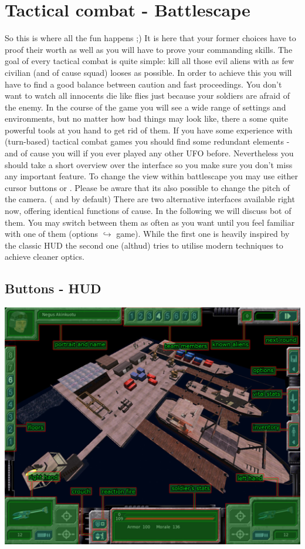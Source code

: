 \section{Tactical combat - Battlescape}

So this is where all the fun happens ;) It is here that your former choices have to proof their worth as well as you will have to prove your commanding skills.
The goal of every tactical combat is quite simple: kill all those evil aliens with as few civilian (and of cause squad) looses as possible. In order to achieve this you will have to find a good balance between caution and fast proceedings. You don't want to watch all innocents die like flies just because your soldiers are afraid of the enemy.
In the course of the game you will see a wide range of settings and environments, but no matter how bad things may look like, there a some quite powerful tools at you hand to get rid of them. If you have some experience with (turn-based) tactical combat games you should find some redundant elements - and of cause you will if you ever played any other UFO before. Nevertheless you should take a short overview over the interface so you make sure you don't miss any important feature. To change the view within battlescape you may use either cursor buttons or . Please be aware that its also possible to change the pitch of the camera. ( and  by default)
There are two alternative interfaces available right now, offering identical functions of cause. In the following we will discuss bot of them. You may switch between them as often as you want until you feel familiar with one of them (options $\hookrightarrow$ game).
While the first one is heavily inspired by the classic HUD the second one (althud) tries to utilise modern techniques to achieve cleaner optics.

\subsection{Buttons - HUD}
\includegraphics[width=\textwidth]{images/HUD_final.jpg}
